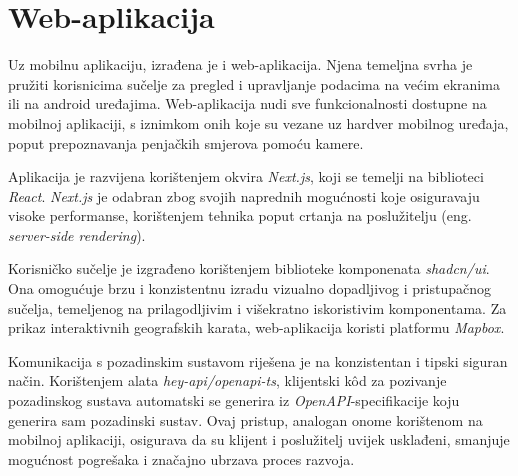 \section{Web-aplikacija}

Uz mobilnu aplikaciju, izrađena je i web-aplikacija. Njena temeljna svrha je pružiti korisnicima sučelje za pregled i upravljanje podacima na većim ekranima ili na android uređajima. Web-aplikacija nudi sve funkcionalnosti dostupne na mobilnoj aplikaciji, s iznimkom onih koje su vezane uz hardver mobilnog uređaja, poput prepoznavanja penjačkih smjerova pomoću kamere.

Aplikacija je razvijena korištenjem okvira \textit{Next.js}, koji se temelji na biblioteci \textit{React}. \textit{Next.js} je odabran zbog svojih naprednih mogućnosti koje osiguravaju visoke performanse, korištenjem tehnika poput crtanja na poslužitelju (eng. \textit{server-side rendering}).

Korisničko sučelje je izgrađeno korištenjem biblioteke komponenata \textit{shadcn/ui}. Ona omogućuje brzu i konzistentnu izradu vizualno dopadljivog i pristupačnog sučelja, temeljenog na prilagodljivim i višekratno iskoristivim komponentama. Za prikaz interaktivnih geografskih karata, web-aplikacija koristi platformu \textit{Mapbox}.

Komunikacija s pozadinskim sustavom riješena je na konzistentan i tipski siguran način. Korištenjem alata \textit{hey-api/openapi-ts}, klijentski kôd za pozivanje pozadinskog sustava automatski se generira iz \textit{OpenAPI}-specifikacije koju generira sam pozadinski sustav. Ovaj pristup, analogan onome korištenom na mobilnoj aplikaciji, osigurava da su klijent i poslužitelj uvijek usklađeni, smanjuje mogućnost pogrešaka i značajno ubrzava proces razvoja.